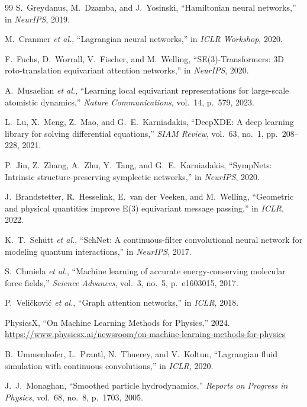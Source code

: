 \documentclass[11pt,a4paper]{article}
\begin{document}
\begin{thebibliography}{99}
S.~Greydanus, M.~Dzamba, and J.~Yosinski,
``Hamiltonian neural networks,''
in \textit{NeurIPS}, 2019.

M.~Cranmer \emph{et al.},
``Lagrangian neural networks,''
in \textit{ICLR Workshop}, 2020.

F.~Fuchs, D.~Worrall, V.~Fischer, and M.~Welling,
``SE(3)-Transformers: 3D roto-translation equivariant attention networks,''
in \textit{NeurIPS}, 2020.

A.~Musaelian \emph{et al.},
``Learning local equivariant representations for large-scale atomistic dynamics,''
\textit{Nature Communications}, vol.~14, p.~579, 2023.

L.~Lu, X.~Meng, Z.~Mao, and G.~E.~Karniadakis,
``DeepXDE: A deep learning library for solving differential equations,''
\textit{SIAM Review}, vol.~63, no.~1, pp.~208--228, 2021.

P.~Jin, Z.~Zhang, A.~Zhu, Y.~Tang, and G.~E.~Karniadakis,
``SympNets: Intrinsic structure-preserving symplectic networks,''
in \textit{NeurIPS}, 2020.

J.~Brandstetter, R.~Hesselink, E.~van der Veeken, and M.~Welling,
``Geometric and physical quantities improve E(3) equivariant message passing,''
in \textit{ICLR}, 2022.

K.~T.~Sch\"{u}tt \emph{et al.},
``SchNet: A continuous-filter convolutional neural network for modeling quantum interactions,''
in \textit{NeurIPS}, 2017.

S.~Chmiela \emph{et al.},
``Machine learning of accurate energy-conserving molecular force fields,''
\textit{Science Advances}, vol.~3, no.~5, p.~e1603015, 2017.

P.~Veli\v{c}kovi\'{c} \emph{et al.},
``Graph attention networks,''
in \textit{ICLR}, 2018.

PhysicsX, ``On Machine Learning Methods for Physics,''
2024. \url{https://www.physicsx.ai/newsroom/on-machine-learning-methods-for-physics}

B.~Ummenhofer, L.~Prantl, N.~Thuerey, and V.~Koltun,
``Lagrangian fluid simulation with continuous convolutions,''
in \textit{ICLR}, 2020.

J.~J.~Monaghan,
``Smoothed particle hydrodynamics,''
\textit{Reports on Progress in Physics}, vol.~68, no.~8, p.~1703, 2005.


\end{thebibliography}
\end{document}
